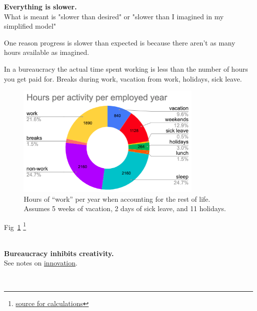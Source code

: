 \textbf{Everything is slower.}\\
What is meant is "slower than desired" or "slower than I imagined in my simplified model"

One reason progress is slower than expected is because there aren't as many hours available as imagined.



In a bureaucracy the actual time spent working is less than the number of hours you get paid for. Breaks during work, vacation from work, holidays, sick leave. 


\begin{figure}[H]
    \centering
    \includegraphics[width=0.8\textwidth]{images/hours_per_activity_per_employed_year}
    \caption{Hours of ``work'' per year when accounting for the rest of life. Assumes 5 weeks of vacation, 2 days of sick leave, and 11 holidays.}
    \label{fig:hours_per_year}
\end{figure}

Fig~\ref{fig:hours_per_year}
\footnote{\href{https://docs.google.com/spreadsheets/d/1ZaOZZXWkEzX4fFltUdlR4A6ENrAXnkzTW4YrjA4tDO8/edit?usp=sharing}{source for calculations}}

\ \\

\textbf{Bureaucracy inhibits creativity.}\\
See 
notes on \hyperref[sec:innovation]{innovation}.

\ \\

